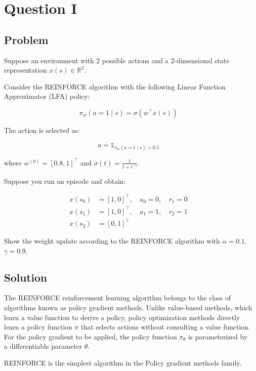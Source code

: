 \documentclass[main.tex]{subfiles}
\begin{document}
	
	\section{Question I}
	\subsection{Problem}
	
	Suppose an environment with 2 possible actions and a 2-dimensional state representation $x(s) \in \mathbb{R}^2$.
	
	Consider the REINFORCE algorithm with the following Linear Function Approximator (LFA) policy:
	
	\begin{equation}
		\pi_w(a=1 \mid s) = \sigma(w^\top x(s))
	\end{equation}
	
	The action is selected as:
	
	\begin{equation*}
		a = \mathbb{1}_{\pi_w(a=1 \mid s) > 0.5}
	\end{equation*}
	
	where $w^{(0)} = [0.8, 1]^\top$ and $\sigma(t) = \frac{1}{1 + e^{-t}}$.
	
	Suppose you run an episode and obtain:
	
	\begin{align*}
		x(s_0) &= [1,0]^\top, \quad a_0 = 0, \quad r_1 = 0 \\
		x(s_1) &= [1,0]^\top, \quad a_1 = 1, \quad r_2 = 1 \\
		x(s_2) &= [0,1]^\top
	\end{align*}
	
	Show the weight update according to the REINFORCE algorithm with $\alpha=0.1$, $\gamma=0.9$.
	
	
	\subsection{Solution}
	
	The REINFORCE reinforcement learning algorithm belongs to the class of algorithms known as policy gradient methods. Unlike value-based methods, which learn a value function to derive a policy, policy optimization methods directly learn a policy function $\pi$ that selects actions without consulting a value function. For the policy gradient to be applied, the policy function $\pi_\theta$
	is parameterized by a differentiable parameter $\theta$.
	
	REINFORCE is the simplest algorithm in the Policy gradient methods family.
	
\end{document}
